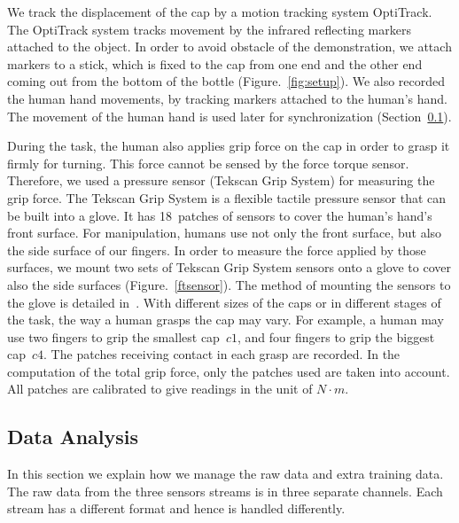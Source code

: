 We track the displacement of the cap by a motion tracking system
OptiTrack. The OptiTrack system tracks movement by the infrared
reflecting markers attached to the object. In order to avoid obstacle
of the demonstration, we attach markers to a stick, which is fixed to
the cap from one end and the other end coming out from the bottom of
the bottle (Figure.~\ref{fig:setup}). We also recorded the human hand
movements, by tracking markers attached to the human's hand. The
movement of the human hand is used later for synchronization
(Section~\ref{dataanalysis}).

During the task, the human also applies grip force on the cap in order
to grasp it firmly for turning. This force cannot be sensed by the
force torque sensor. Therefore, we used a pressure sensor (Tekscan
Grip System) for measuring the grip force. The Tekscan Grip System is
a flexible tactile pressure sensor that can be built into a glove. It
has 18~patches of sensors to cover the human's hand's front
surface. For manipulation, humans use not only the front surface, but
also the side surface of our fingers. In order to measure the force
applied by those surfaces, we mount two sets of Tekscan Grip System
sensors onto a glove to cover also the side surfaces
(Figure.~\ref{ftsensor}). The method of mounting the sensors to the glove
is detailed in~\citep{deSouza2014}. With different sizes of the caps
or in different stages of the task, the way a human grasps the cap may
vary.  For example, a human may use two fingers to grip the smallest
cap~$c1$, and four fingers to grip the biggest cap~$c4$. The patches
receiving contact in each grasp are recorded. In the computation of
the total grip force, only the patches used are taken into
account. All patches are calibrated to give readings in the unit of
$N{\cdot}m$.


\subsection{Data Analysis}
\label{dataanalysis}
In this section we explain how we manage the raw data and extra
training data.  The raw data from the three sensors streams is in
three separate channels. Each stream has a different format and hence
is handled differently.

